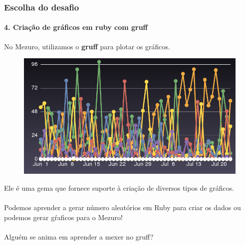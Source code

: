 \documentclass{beamer}
\begin{document}
\begin{frame}
	\frametitle{Escolha do desafio}
  \framesubtitle{4. Criação de gráficos em ruby com gruff}
  
  No Mezuro, utilizamos o \textbf{gruff} para plotar os gráficos.

  \begin{figure}[htb]
    \begin{center}
      \includegraphics[scale=0.15]{graph.png}
    \end{center}
  \end{figure}
  
  Ele é uma gema que fornece suporte à criação de diversos tipos de gráficos. \\~\\
  Podemos aprender a gerar número aleatórios em Ruby para criar os dados ou podemos gerar gŕaficos para o Mezuro! \\~\\
  
  Alguém se anima em aprender a mexer no gruff?
\end{frame}
\end{document}
